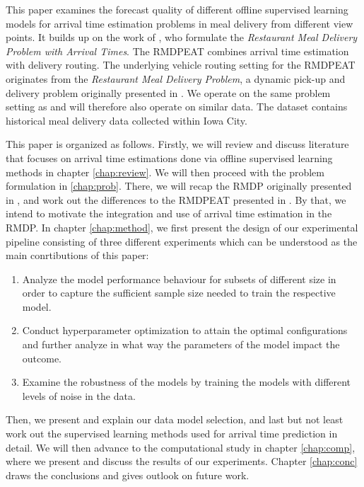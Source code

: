 This paper examines the forecast quality of different offline supervised learning models for arrival time estimation problems in meal delivery from different view points. It builds up on the work of \cite{Hildebrandt2020_EAT}, who formulate the \textit{Restaurant Meal Delivery Problem with Arrival Times}. The RMDPEAT combines arrival time estimation with delivery routing. The underlying vehicle routing setting for the RMDPEAT originates from the \textit{Restaurant Meal Delivery Problem}, a dynamic pick-up and delivery problem originally presented in \cite{UlmerRMDP}. We operate on the same problem setting as \cite{Hildebrandt2020_EAT} and will therefore also operate on similar data. The dataset contains historical meal delivery data collected within Iowa City.  

This paper is organized as follows. Firstly, we will review and discuss literature that focuses on arrival time estimations done via offline supervised learning methods in chapter \ref{chap:review}. We will then proceed with the problem formulation in \ref{chap:prob}. There, we will recap the RMDP originally presented in \cite{UlmerRMDP}, and work out the differences to the RMDPEAT presented in \cite{Hildebrandt2020_EAT}. By that, we intend to motivate the integration and use of arrival time estimation in the RMDP. In chapter \ref{chap:method}, we first present the design of our experimental pipeline consisting of three different experiments which can be understood as the main conrtibutions of this paper:
\begin{enumerate}
	\item Analyze the model performance behaviour for subsets of different size in order to capture the sufficient sample size needed to train the respective model.
	\item Conduct hyperparameter optimization to attain the optimal configurations and further analyze in what way the parameters of the model impact the outcome. 
	\item Examine the robustness of the models by training the models with different levels of noise in the data.
\end{enumerate}
Then, we present and explain our data model selection, and last but not least work out the supervised learning methods used for arrival time prediction in detail. We will then advance to the computational study in chapter \ref{chap:comp}, where we present and discuss the results of our experiments.
Chapter \ref{chap:conc} draws the conclusions and gives outlook on future work.
 